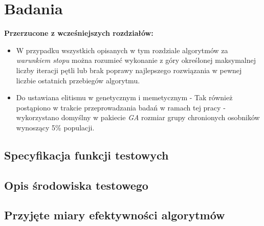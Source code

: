 \newpage
\chapter{Badania}
\textbf{Przerzucone z wcześniejszych rozdziałów:}
\begin{itemize}
\item W przypadku wszystkich opisanych w tym rozdziale algorytmów za \emph{warunkiem stopu} można rozumieć wykonanie z góry określonej maksymalnej liczby iteracji pętli lub brak poprawy najlepszego rozwiązania w pewnej liczbie ostatnich przebiegów algorytmu. 
\item Do ustawiana elitismu w genetycznym i memetycznym - Tak również postąpiono w trakcie przeprowadzania badań w ramach tej pracy - wykorzystano domyślny w pakiecie \emph{GA} rozmiar grupy chronionych osobników wynoszący 5\% populacji.
\end{itemize}


\section{Specyfikacja funkcji testowych}

\section{Opis środowiska testowego}

\section{Przyjęte miary efektywności algorytmów}
\label{sec:przyjete_miary_efektywnosci_algorytmow}